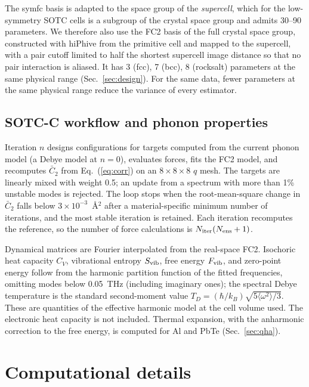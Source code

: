 \documentclass[aip,jap,reprint,amsmath,amssymb,floatfix]{revtex4-2}
\begin{document}
The symfc basis is adapted to the space group of the \emph{supercell}, which
for the low-symmetry SOTC cells is a subgroup of the crystal space group and
admits 30--90 parameters. We therefore also use the FC2 basis of the full
crystal space group, constructed with hiPhive \cite{ref59} from the primitive
cell and mapped to the supercell, with a pair cutoff limited to half the
shortest supercell image distance so that no pair interaction is aliased. It
has 3 (fcc), 7 (bcc), 8 (rocksalt) parameters at the same physical range
(Sec.~\ref{sec:design}). For the same data, fewer parameters at the same
physical range reduce the variance of every estimator.

\subsection{SOTC-C workflow and phonon properties}\label{sec:selfcons}

Iteration $n$ designs configurations for targets computed from the current
phonon model (a Debye model at $n=0$), evaluates forces, fits the FC2 model,
and recomputes $\bar C_2$ from Eq.~(\ref{eq:corr}) on an $8\times8\times8$ $q$
mesh. The targets are linearly mixed with weight 0.5; an update from a spectrum
with more than 1\% unstable modes is rejected. The loop stops when the
root-mean-square change in $\bar C_2$ falls below $3\times10^{-3}$~\AA$^2$ after
a material-specific minimum number of iterations, and the most stable iteration
is retained. Each iteration recomputes the reference, so the number of force
calculations is $N_{\rm iter}(N_{\rm ens}+1)$.

Dynamical matrices are Fourier interpolated from the real-space FC2.
Isochoric heat capacity $C_V$, vibrational entropy $S_{\rm vib}$, free energy
$F_{\rm vib}$, and zero-point energy follow from the harmonic partition
function of the fitted frequencies, omitting modes below 0.05~THz (including
imaginary ones); the spectral Debye temperature is the standard second-moment
value $T_D=(\hbar/k_B)\sqrt{5\langle\omega^2\rangle/3}$. These are quantities of the
effective harmonic model at the cell volume used. The electronic heat
capacity is not included. Thermal expansion, with the anharmonic correction
to the free energy, is computed for Al and PbTe (Sec.~\ref{sec:qha}).

\section{Computational details}\label{sec:comp}
\end{document}
